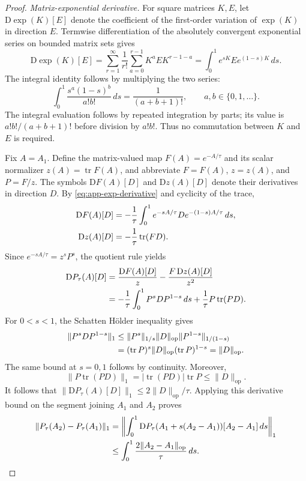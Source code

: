 \documentclass[10pt,twoside,letterpaper]{article}
\newcommand{\tr}{\operatorname{tr}}
\newcommand{\op}{\mathrm{op}}
\newcommand{\norm}[1]{\lVert #1\rVert}
\begin{document}
\begin{proof}
\textit{Matrix-exponential derivative.}
For square matrices $K,E$, let $\mathrm D\exp(K)[E]$ denote the
coefficient of the first-order variation of $\exp(K)$ in direction $E$.
Termwise differentiation of the absolutely convergent exponential
series on bounded matrix sets gives
\begin{equation}
\mathrm D\exp(K)[E]
=\sum_{r=1}^\infty\frac1{r!}
\sum_{a=0}^{r-1}K^aEK^{r-1-a}
=\int_0^1e^{sK}Ee^{(1-s)K}\,ds.
\label{eq:app-exp-derivative}
\end{equation}
The integral identity follows by multiplying the two series:
\begin{equation}
\int_0^1\frac{s^a(1-s)^b}{a!b!}\,ds
=\frac1{(a+b+1)!},\qquad a,b\in\{0,1,\ldots\}.
\label{eq:app-beta-integral}
\end{equation}
The integral evaluation follows by repeated integration by parts;
its value is $a!b!/(a+b+1)!$ before division by $a!b!$.
Thus no commutation between $K$ and $E$ is required.

Fix $A=A_1$. Define the matrix-valued map $F(A)=e^{-A/\tau}$
and its scalar normalizer $z(A)=\tr F(A)$, and abbreviate
$F=F(A)$, $z=z(A)$, and $P=F/z$. The symbols
$\mathrm DF(A)[D]$ and $\mathrm Dz(A)[D]$ denote their derivatives
in direction $D$. By \eqref{eq:app-exp-derivative} and cyclicity of the trace,
\begin{align}
\mathrm DF(A)[D]&=-\frac1\tau
\int_0^1e^{-sA/\tau}De^{-(1-s)A/\tau}\,ds,\notag\\
\mathrm Dz(A)[D]&=-\frac1\tau\tr(FD).
\label{eq:app-exp-normalizer}
\end{align}
Since $e^{-sA/\tau}=z^sP^s$, the quotient rule yields
\begin{align}
\mathrm DP_\tau(A)[D]
&=\frac{\mathrm DF(A)[D]}z-\frac{F\,\mathrm Dz(A)[D]}{z^2}\notag\\
&=-\frac1\tau\int_0^1P^sDP^{1-s}\,ds
+\frac1\tau P\tr(PD).
\label{eq:app-duhamel}
\end{align}
For $0<s<1$, the Schatten H\"older inequality gives
\begin{align}
\norm{P^sDP^{1-s}}_1
&\le\norm{P^s}_{1/s}\norm{D}_{\op}
\norm{P^{1-s}}_{1/(1-s)}\notag\\
&=(\tr P)^s\norm{D}_{\op}(\tr P)^{1-s}
=\norm{D}_{\op}.
\label{eq:app-holder-density}
\end{align}
The same bound at $s=0,1$ follows by continuity. Moreover,
\begin{equation}
\norm{P\tr(PD)}_1
=|\tr(PD)|\tr P\le\norm{D}_{\op}.
\label{eq:app-trace-part}
\end{equation}
It follows that
$\norm{\mathrm DP_\tau(A)[D]}_1\le2\norm{D}_{\op}/\tau$.
Applying this derivative bound on the segment joining $A_1$ and $A_2$
proves
\begin{align}
\norm{P_\tau(A_2)-P_\tau(A_1)}_1
&=\left\|\int_0^1\mathrm DP_\tau(A_1+s(A_2-A_1))
[A_2-A_1]\,ds\right\|_1\notag\\
&\le\int_0^1\frac{2\norm{A_2-A_1}_{\op}}\tau\,ds.
\label{eq:app-integrated-sensitivity}
\end{align}


\end{proof}
\end{document}
